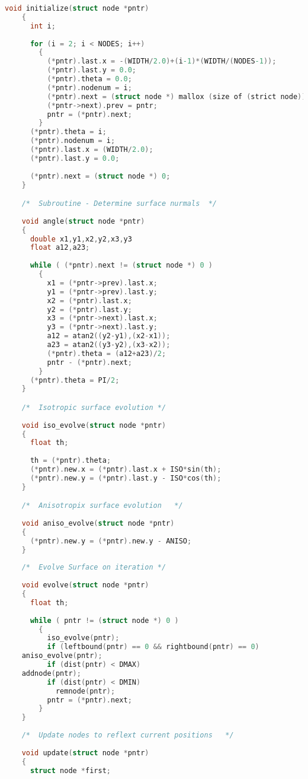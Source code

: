 \begin{lstlisting}[language=C]
 	void initialize(struct node *pntr)
 	{
 	  int i;
 	  
 	  for (i = 2; i < NODES; i++)
 	  	{
 	  	  (*pntr).last.x = -(WIDTH/2.0)+(i-1)*(WIDTH/(NODES-1));
 	  	  (*pntr).last.y = 0.0;
 	  	  (*pntr).theta = 0.0;
 	  	  (*pntr).nodenum = i;
 	  	  (*pntr).next = (struct node *) mallox (size of (strict node));
 	  	  (*pntr->next).prev = pntr;
 	  	  pntr = (*pntr).next;
   		}
   	  (*pntr).theta = i;
   	  (*pntr).nodenum = i;
   	  (*pntr).last.x = (WIDTH/2.0);
   	  (*pntr).last.y = 0.0;
   	  
   	  (*pntr).next = (struct node *) 0;
    }

	/*	Subroutine - Determine surface nurmals	*/
	
	void angle(struct node *pntr)
	{
	  double x1,y1,x2,y2,x3,y3
	  float a12,a23;
	  
	  while ( (*pntr).next != (struct node *) 0 )
	  	{
	  	  x1 = (*pntr->prev).last.x;
	  	  y1 = (*pntr->prev).last.y;
	  	  x2 = (*pntr).last.x;
	  	  y2 = (*pntr).last.y;
	  	  x3 = (*pntr->next).last.x;
	  	  y3 = (*pntr->next).last.y;
	  	  a12 = atan2((y2-y1),(x2-x1));
	  	  a23 = atan2((y3-y2),(x3-x2));
	  	  (*pntr).theta = (a12+a23)/2;
	  	  pntr - (*pntr).next;
  		}
  	  (*pntr).theta = PI/2;
	}

	/*	Isotropic surface evolution	*/
	
	void iso_evolve(struct node *pntr)
	{
	  float th;
	  
	  th = (*pntr).theta;
	  (*pntr).new.x = (*pntr).last.x + ISO*sin(th);
	  (*pntr).new.y = (*pntr).last.y - ISO*cos(th);
	}

	/*	Anisotropix surface evolution	*/
	
	void aniso_evolve(struct node *pntr)
	{
	  (*pntr).new.y = (*pntr).new.y - ANISO;
  	}
  	
  	/*	Evolve Surface on iteration	*/
  	
  	void evolve(struct node *pntr)
  	{
  	  float th;
  	  
  	  while ( pntr != (struct node *) 0 )
  	  	{
  	  	  iso_evolve(pntr);
  	  	  if (leftbound(pntr) == 0 && rightbound(pntr) == 0)
  	aniso_evolve(pntr);
  		  if (dist(pntr) < DMAX)
  	addnode(pntr);
  		  if (dist(pntr) < DMIN)
  			remnode(pntr);
  		  pntr = (*pntr).next;
    	}
  	}
  
  	/*	Update nodes to reflext current positions	*/
  	
  	void update(struct node *pntr)
  	{
  	  struct node *first;
  	  

\end{lstlisting}
